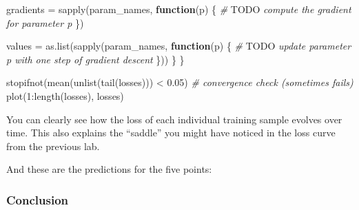 \documentclass[
  a4paper,
]{article}
\newenvironment{Shaded}{\begin{snugshade}}{\end{snugshade}}
\newcommand{\AlertTok}[1]{\textcolor[rgb]{0.94,0.16,0.16}{#1}}
\newcommand{\CommentTok}[1]{\textcolor[rgb]{0.56,0.35,0.01}{\textit{#1}}}
\newcommand{\ControlFlowTok}[1]{\textcolor[rgb]{0.13,0.29,0.53}{\textbf{#1}}}
\newcommand{\DecValTok}[1]{\textcolor[rgb]{0.00,0.00,0.81}{#1}}
\newcommand{\FloatTok}[1]{\textcolor[rgb]{0.00,0.00,0.81}{#1}}
\newcommand{\FunctionTok}[1]{\textcolor[rgb]{0.00,0.00,0.00}{#1}}
\newcommand{\NormalTok}[1]{#1}
\newcommand{\OtherTok}[1]{\textcolor[rgb]{0.56,0.35,0.01}{#1}}
\newcommand{\SpecialCharTok}[1]{\textcolor[rgb]{0.00,0.00,0.00}{#1}}
\newcommand{\StringTok}[1]{\textcolor[rgb]{0.31,0.60,0.02}{#1}}
\begin{document}
\begin{Shaded}
\begin{Highlighting}[]
\NormalTok{    gradients }\OtherTok{=} \FunctionTok{sapply}\NormalTok{(param\_names, }\ControlFlowTok{function}\NormalTok{(p) \{}
      \CommentTok{\# }\AlertTok{TODO}\CommentTok{ compute the gradient for parameter p}
\NormalTok{    \})}
    
\NormalTok{    values }\OtherTok{=} \FunctionTok{as.list}\NormalTok{(}\FunctionTok{sapply}\NormalTok{(param\_names, }\ControlFlowTok{function}\NormalTok{(p) \{}
      \CommentTok{\# }\AlertTok{TODO}\CommentTok{ update parameter p with one step of gradient descent}
\NormalTok{    \}))}
\NormalTok{  \}}
\NormalTok{\}}

\FunctionTok{stopifnot}\NormalTok{(}\FunctionTok{mean}\NormalTok{(}\FunctionTok{unlist}\NormalTok{(}\FunctionTok{tail}\NormalTok{(losses))) }\SpecialCharTok{\textless{}} \FloatTok{0.05}\NormalTok{) }\CommentTok{\# convergence check (sometimes fails)}
\FunctionTok{plot}\NormalTok{(}\DecValTok{1}\SpecialCharTok{:}\FunctionTok{length}\NormalTok{(losses), losses)}
\end{Highlighting}
\end{Shaded}

You can clearly see how the loss of each individual training sample
evolves over time. This also explains the ``saddle'' you might have
noticed in the loss curve from the previous lab.

And these are the predictions for the five points:

\begin{Shaded}
\end{Shaded}

\hypertarget{conclusion}{%
\subsubsection{Conclusion}\label{conclusion}}
\end{document}
